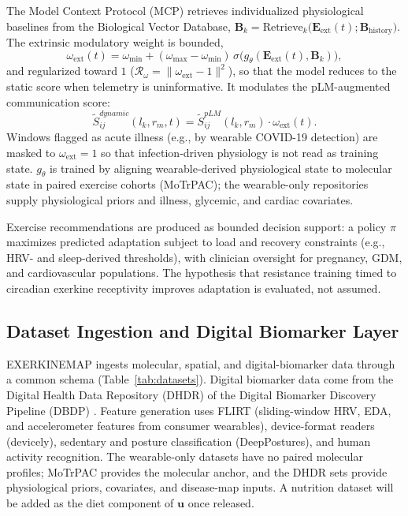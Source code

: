 \documentclass[11pt]{article}
\begin{document}
The Model Context Protocol (MCP) retrieves individualized physiological baselines from the Biological Vector Database, $\mathbf{B}_k=\text{Retrieve}_k\big(\mathbf{E}_{\text{ext}}(t);\mathbf{B}_{\text{history}}\big)$. The extrinsic modulatory weight is bounded,
\begin{equation}
\omega_{\text{ext}}(t)=\omega_{\min}+(\omega_{\max}-\omega_{\min})\,\sigma\!\big(g_\theta(\mathbf{E}_{\text{ext}}(t),\mathbf{B}_k)\big),
\end{equation}
and regularized toward $1$ ($\mathcal{R}_\omega=\|\omega_{\text{ext}}-1\|^2$), so that the model reduces to the static score when telemetry is uninformative. It modulates the pLM-augmented communication score:
\begin{equation}
\widetilde{S}^{dynamic}_{ij}(l_k,r_m,t)=\widetilde{S}^{pLM}_{ij}(l_k,r_m)\cdot\omega_{\text{ext}}(t).
\end{equation}
Windows flagged as acute illness (e.g., by wearable COVID-19 detection) are masked to $\omega_{\text{ext}}=1$ so that infection-driven physiology is not read as training state. $g_\theta$ is trained by aligning wearable-derived physiological state to molecular state in paired exercise cohorts (MoTrPAC); the wearable-only repositories supply physiological priors and illness, glycemic, and cardiac covariates.

Exercise recommendations are produced as bounded decision support: a policy $\pi$ maximizes predicted adaptation subject to load and recovery constraints (e.g., HRV- and sleep-derived thresholds), with clinician oversight for pregnancy, GDM, and cardiovascular populations. The hypothesis that resistance training timed to circadian exerkine receptivity improves adaptation is evaluated, not assumed.

\subsection{Dataset Ingestion and Digital Biomarker Layer}
\label{sec:datasets}
EXERKINEMAP ingests molecular, spatial, and digital-biomarker data through a common schema (Table~\ref{tab:datasets}). Digital biomarker data come from the Digital Health Data Repository (DHDR) of the Digital Biomarker Discovery Pipeline (DBDP) \cite{dbdp}. Feature generation uses FLIRT (sliding-window HRV, EDA, and accelerometer features from consumer wearables), device-format readers (devicely), sedentary and posture classification (DeepPostures), and human activity recognition. The wearable-only datasets have no paired molecular profiles; MoTrPAC provides the molecular anchor, and the DHDR sets provide physiological priors, covariates, and disease-map inputs. A nutrition dataset will be added as the diet component of $\mathbf{u}$ once released.
\end{document}
